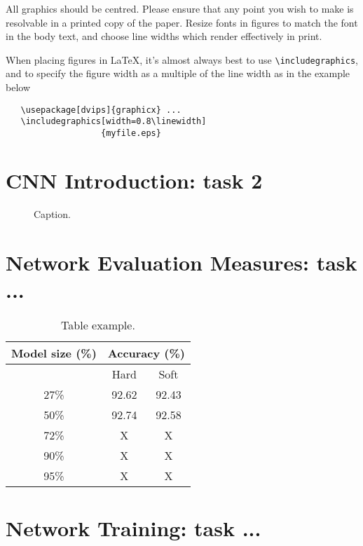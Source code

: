\documentclass[10pt,twocolumn,letterpaper]{article}
\begin{document}
All graphics should be centred.  Please ensure that any point you wish to
make is resolvable in a printed copy of the paper.  Resize fonts in figures
to match the font in the body text, and choose line widths which render
effectively in print. 

When placing figures in \LaTeX, it's almost always best to use
\verb+\includegraphics+, and to specify the  figure width as a multiple of
the line width as in the example below
{\small\begin{verbatim}
   \usepackage[dvips]{graphicx} ...
   \includegraphics[width=0.8\linewidth]
                   {myfile.eps}
\end{verbatim}
}

\section{CNN Introduction: task 2}

\begin{figure}[t]
\begin{center}
\fbox{\rule{0pt}{1in} \rule{0.8\linewidth}{0pt}}
\end{center}
   \caption{Caption.}
\label{fig:long}
\label{fig:onecol}
\end{figure}



\section{Network Evaluation Measures: task ...}


\begin{table}[ht]
\small
    \centering
    \begin{tabular}{c|c|c}
        Model size (\%) & \multicolumn{2}{c}{ Accuracy (\%)} \\
        \hline
        & Hard & Soft \\
        \hline
        27\% & 92.62 & 92.43 \\ %
        50\% & 92.74 & 92.58 \\ %
        72\% & X & X \\ %
        90\% & X & X \\ %
        95\% & X & X \\ %
    \end{tabular}%
    \medbreak
    \caption{Table example.}
    \label{table:hard_vs_soft_pruning}
\end{table}
\section{Network Training: task ...}

{\small


}
\end{document}
